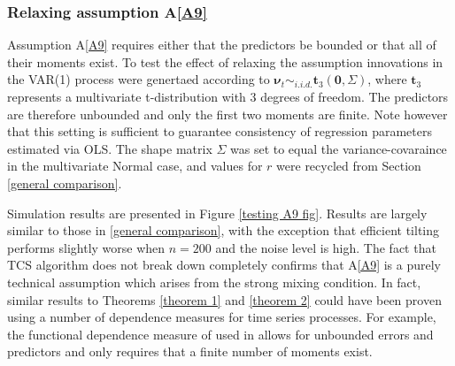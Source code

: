 \documentclass[11pt]{report}\usepackage[utf8]{inputenc}
\begin{document}
\subsubsection{Relaxing assumption A\ref{A9}}

Assumption A\ref{A9} requires either that the predictors be bounded or that all of their moments exist. To test the  effect  of  relaxing  the  assumption innovations in the VAR(1) process were genertaed according to $\boldsymbol{\nu}_t \sim_{i.i.d.} \boldsymbol{t}_3\left ( \boldsymbol{0},\Sigma \right )$, where $\boldsymbol{t}_3$ represents a multivariate t-distribution with 3 degrees of freedom. The predictors are therefore unbounded and only the first two moments are finite. Note however that this setting is sufficient to guarantee consistency of regression parameters estimated via OLS. The shape matrix $\Sigma$ was set to equal the variance-covaraince in the multivariate Normal case, and values for $r$ were recycled from Section \ref{general comparison}. 

Simulation results are presented in Figure \ref{testing A9 fig}. Results are largely similar to those in \ref{general comparison}, with the exception that efficient tilting performs slightly worse when $n=200$ and the noise level is high. The fact that TCS algorithm does not break down completely confirms that A\ref{A9} is a purely technical assumption which arises from the strong mixing condition. In fact, similar results to Theorems \ref{theorem 1} and \ref{theorem 2} could have been proven using a number of dependence measures for time series processes. For example, the functional dependence measure of \cite{wu2005nonlinear} used in \cite{yousuf2018variable} allows for unbounded errors and predictors and only requires that a finite number of moments exist. 
\end{document}
